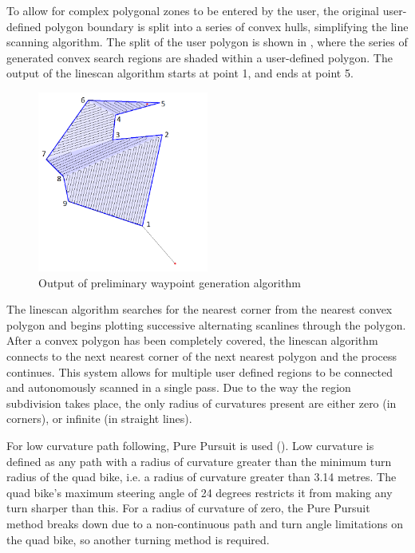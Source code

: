 \documentclass[main.tex]{subfiles}
\begin{document}
To allow for complex polygonal zones to be entered by the user, the original user-defined polygon boundary is split into a series of convex hulls, simplifying the line scanning algorithm. The split of the user polygon is shown in , where the series of generated convex search regions are shaded within a user-defined polygon. The output of the linescan algorithm starts at point 1, and ends at point 5. 
\begin{figure}[ht]
\includegraphics[width=0.5\textwidth]{4-DetailedDesign/lineScanAlgorithm2.png}
\centering
\caption{Output of preliminary waypoint generation algorithm} 
\end{figure}

The linescan algorithm searches for the nearest corner from the nearest convex polygon and begins plotting successive alternating scanlines through the polygon. After a convex polygon has been completely covered, the linescan algorithm connects to the next nearest corner of the next nearest polygon and the process continues. This system allows for multiple user defined regions to be connected and autonomously scanned in a single pass. Due to the way the region subdivision takes place, the only radius of curvatures present are either zero (in corners), or infinite (in straight lines).

For low curvature path following, Pure Pursuit is used (). Low curvature is defined as any path with a radius of curvature greater than the minimum turn radius of the quad bike, i.e. a radius of curvature greater than 3.14 metres. The quad bike's maximum steering angle of 24 degrees restricts it from making any turn sharper than this. For a radius of curvature of zero, the Pure Pursuit method breaks down due to a non-continuous path and turn angle limitations on the quad bike, so another turning method is required.
\end{document}
